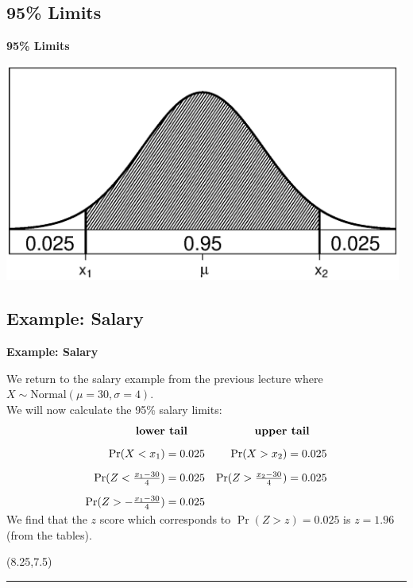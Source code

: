 \documentclass[compress]{beamer}        %
\makeatletter
\newcommand{\tcb}{\textcolor{beamer@blendedblue}}
\makeatother
\begin{document}
\subsection{95\% Limits}
\begin{frame}{\bf \tcb{95\% Limits}}

\begin{center}
\includegraphics[width=0.98\textwidth, trim = 1.5cm 1.5cm 0.7cm 1.5cm, clip]{Norm95}
\end{center}

\end{frame}



\subsection{Example: Salary}
\begin{frame}{\bf \tcb{Example: Salary}}

We return to the salary example from the previous lecture where $X \sim \text{Normal}(\mu=30,\sigma=4)$.\\[0.5cm]

We will now calculate the 95\% salary limits:
\begin{align*}
\text{{\bf lower}}&\text{{\bf \,\,tail}}  & \text{{\bf upper}}&\text{{\bf \,\,tail}} \\[0.2cm]
\Pr(X < x_1) &= 0.025 & \Pr(X > x_2) &= 0.025\\[0.2cm]
\Pr(Z < \tfrac{x_1-30}{4}) &= 0.025 & \Pr(Z > \tfrac{x_2-30}{4}) &= 0.025 \\[0.2cm]
\Pr(Z > -\tfrac{x_1-30}{4}) &= 0.025 &&\\[-0.3cm]
\end{align*}

We find that the $z$ score which corresponds to $\Pr(Z > z) = 0.025$ is $z = 1.96$ (from the tables).

\begin{textblock}{1}(8.25,7.5)
\xymatrixcolsep{0.8cm}
\rule{1pt}{2.7cm}
\end{textblock}

\end{frame}
\end{document}
